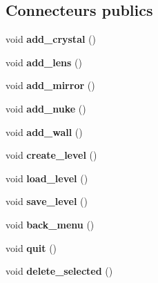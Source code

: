 \subsection*{Connecteurs publics}
\begin{DoxyCompactItemize}
\item 
\hypertarget{classMainEditor_a11c01691ed4e4385c40ded07b2a4044e}{void {\bfseries add\+\_\+crystal} ()}\label{classMainEditor_a11c01691ed4e4385c40ded07b2a4044e}

\item 
\hypertarget{classMainEditor_a9cc5457b86afb73a672f12d8915082c7}{void {\bfseries add\+\_\+lens} ()}\label{classMainEditor_a9cc5457b86afb73a672f12d8915082c7}

\item 
\hypertarget{classMainEditor_a3ea0d26648a2a91f4c51fd78d06c4bd7}{void {\bfseries add\+\_\+mirror} ()}\label{classMainEditor_a3ea0d26648a2a91f4c51fd78d06c4bd7}

\item 
\hypertarget{classMainEditor_ac1563d2cb8788295cea11a3d4f668f1e}{void {\bfseries add\+\_\+nuke} ()}\label{classMainEditor_ac1563d2cb8788295cea11a3d4f668f1e}

\item 
\hypertarget{classMainEditor_a2212ba27b33fa70c0b45e3d58d784c1e}{void {\bfseries add\+\_\+wall} ()}\label{classMainEditor_a2212ba27b33fa70c0b45e3d58d784c1e}

\item 
\hypertarget{classMainEditor_a53ba9857e08e47f075487fff2c07f88e}{void {\bfseries create\+\_\+level} ()}\label{classMainEditor_a53ba9857e08e47f075487fff2c07f88e}

\item 
\hypertarget{classMainEditor_a84fe185f03ff8984471380206607e2a1}{void {\bfseries load\+\_\+level} ()}\label{classMainEditor_a84fe185f03ff8984471380206607e2a1}

\item 
\hypertarget{classMainEditor_a21dcf035be9044cd0e4677761f778505}{void {\bfseries save\+\_\+level} ()}\label{classMainEditor_a21dcf035be9044cd0e4677761f778505}

\item 
\hypertarget{classMainEditor_a41d9558029b00e6af70b67b2ef6b2abd}{void {\bfseries back\+\_\+menu} ()}\label{classMainEditor_a41d9558029b00e6af70b67b2ef6b2abd}

\item 
\hypertarget{classMainEditor_a2ad5e523c18fb96ce38616145b1b050e}{void {\bfseries quit} ()}\label{classMainEditor_a2ad5e523c18fb96ce38616145b1b050e}

\item 
\hypertarget{classMainEditor_a171515374a86a6bb81af0f34a4857cb3}{void {\bfseries delete\+\_\+selected} ()}\label{classMainEditor_a171515374a86a6bb81af0f34a4857cb3}

\end{DoxyCompactItemize}
